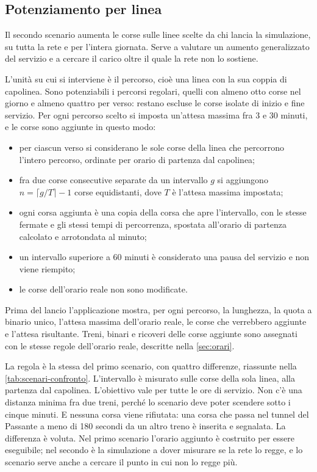 \subsection{Potenziamento per linea}
Il secondo scenario aumenta le corse sulle linee scelte da chi lancia la simulazione, su tutta la rete e per l'intera giornata. Serve a valutare un aumento generalizzato del servizio e a cercare il carico oltre il quale la rete non lo sostiene.

L'unità su cui si interviene è il percorso, cioè una linea con la sua coppia di capolinea. Sono potenziabili i percorsi regolari, quelli con almeno otto corse nel giorno e almeno quattro per verso: restano escluse le corse isolate di inizio e fine servizio. Per ogni percorso scelto si imposta un'attesa massima fra 3 e 30 minuti, e le corse sono aggiunte in questo modo:
\begin{itemize}
	\item per ciascun verso si considerano le sole corse della linea che percorrono l'intero percorso, ordinate per orario di partenza dal capolinea;
	\item fra due corse consecutive separate da un intervallo $g$ si aggiungono $n = \lceil g/T \rceil - 1$ corse equidistanti, dove $T$ è l'attesa massima impostata;
	\item ogni corsa aggiunta è una copia della corsa che apre l'intervallo, con le stesse fermate e gli stessi tempi di percorrenza, spostata all'orario di partenza calcolato e arrotondata al minuto;
	\item un intervallo superiore a 60 minuti è considerato una pausa del servizio e non viene riempito;
	\item le corse dell'orario reale non sono modificate.
\end{itemize}
Prima del lancio l'applicazione mostra, per ogni percorso, la lunghezza, la quota a binario unico, l'attesa massima dell'orario reale, le corse che verrebbero aggiunte e l'attesa risultante. Treni, binari e ricoveri delle corse aggiunte sono assegnati con le stesse regole dell'orario reale, descritte nella \cref{sec:orari}.

La regola è la stessa del primo scenario, con quattro differenze, riassunte nella \cref{tab:scenari-confronto}. L'intervallo è misurato sulle corse della sola linea, alla partenza dal capolinea. L'obiettivo vale per tutte le ore di servizio. Non c'è una distanza minima fra due treni, perché lo scenario deve poter scendere sotto i cinque minuti. E nessuna corsa viene rifiutata: una corsa che passa nel tunnel del Passante a meno di 180 secondi da un altro treno è inserita e segnalata. La differenza è voluta. Nel primo scenario l'orario aggiunto è costruito per essere eseguibile; nel secondo è la simulazione a dover misurare se la rete lo regge, e lo scenario serve anche a cercare il punto in cui non lo regge più.

